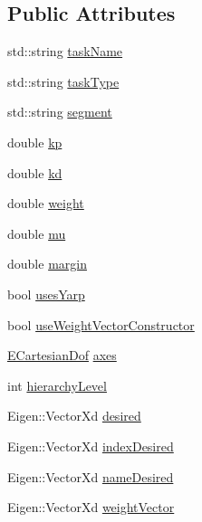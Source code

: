 \subsection*{Public Attributes}
\begin{DoxyCompactItemize}
\item 
std\+::string \hyperlink{classocra_1_1TaskBuilderOptions_ab4d73eb287244b10f00c49f8641e0938}{task\+Name}
\item 
std\+::string \hyperlink{classocra_1_1TaskBuilderOptions_ab0549ba26e607e200af4c596bccac8f8}{task\+Type}
\item 
std\+::string \hyperlink{classocra_1_1TaskBuilderOptions_a49d0ad006ee4ef0a314d3eed9c995c06}{segment}
\item 
double \hyperlink{classocra_1_1TaskBuilderOptions_ad2f50a4fc0ac5e7c48048cb6a123cce6}{kp}
\item 
double \hyperlink{classocra_1_1TaskBuilderOptions_aad265cbbd4016246362cfd6fc375b479}{kd}
\item 
double \hyperlink{classocra_1_1TaskBuilderOptions_a0c60b260526aa7bf2fdb3712cc7f612d}{weight}
\item 
double \hyperlink{classocra_1_1TaskBuilderOptions_a7ddb83d62a8e4121dbc3fb2a1ee9691d}{mu}
\item 
double \hyperlink{classocra_1_1TaskBuilderOptions_acecc869663607553145b3322e3828547}{margin}
\item 
bool \hyperlink{classocra_1_1TaskBuilderOptions_a6f0d1b177c931644f4d66f04b901d565}{uses\+Yarp}
\item 
bool \hyperlink{classocra_1_1TaskBuilderOptions_a5a5d3c5952de35efb29c60c843edafb6}{use\+Weight\+Vector\+Constructor}
\item 
\hyperlink{namespaceocra_a436781c7059a0f76027df1c652126260}{E\+Cartesian\+Dof} \hyperlink{classocra_1_1TaskBuilderOptions_ad29bb1310906e4618c8132dd3cea771c}{axes}
\item 
int \hyperlink{classocra_1_1TaskBuilderOptions_ad32edcc41af7b2aab2d3b66c7f866d75}{hierarchy\+Level}
\item 
Eigen\+::\+Vector\+Xd \hyperlink{classocra_1_1TaskBuilderOptions_a55e98de13c8eaf3f2ace1778034d1466}{desired}
\item 
Eigen\+::\+Vector\+Xd \hyperlink{classocra_1_1TaskBuilderOptions_ade41a041d05ccafcf6c5de4bcedd13e1}{index\+Desired}
\item 
Eigen\+::\+Vector\+Xd \hyperlink{classocra_1_1TaskBuilderOptions_a1e2cceed21f5b42fbfba16f02ee87bc7}{name\+Desired}
\item 
Eigen\+::\+Vector\+Xd \hyperlink{classocra_1_1TaskBuilderOptions_ae86b78dda6e73227f5aeb0447f60158a}{weight\+Vector}

\end{DoxyCompactItemize}
